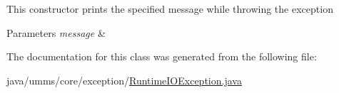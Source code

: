 This constructor prints the specified message while throwing the exception 
\begin{DoxyParams}{Parameters}
{\em message} & \\
\hline
\end{DoxyParams}


The documentation for this class was generated from the following file\+:\begin{DoxyCompactItemize}
\item 
java/umms/core/exception/\hyperlink{_runtime_i_o_exception_8java}{Runtime\+I\+O\+Exception.\+java}\end{DoxyCompactItemize}
